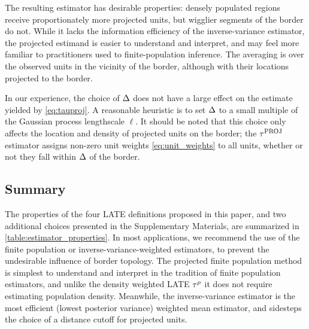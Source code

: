 The resulting estimator has desirable properties: densely populated regions receive proportionately more projected units, but wigglier segments of the border do not.
While it lacks the information efficiency of the inverse-variance estimator,
the projected estimand is easier to understand and interpret,
and may feel more familiar to practitioners used to finite-population inference.
The averaging is over the observed units in the vicinity of the border, although with their locations projected to the border.

In our experience, the choice of \(\Delta\) does not have a large effect on the estimate yielded by \autoref{eq:tauproj}.
A reasonable heuristic is to set \(\Delta\) to a small multiple of the Gaussian process lengthscale \(\ell\).
It should be noted that this choice only affects the location and density of projected units on the border; the \(\tau^{\mathrm{PROJ}}\) estimator assigns non-zero unit weights \autoref{eq:unit_weights} to all units, whether or not they fall within \(\Delta\) of the border.

\subsection{Summary}
\label{sec:summary}

The properties of the four LATE definitions proposed in this paper, and two additional choices presented in the Supplementary Materials, are summarized in \autoref{table:estimator_properties}.
In most applications, we recommend the use of the finite population or inverse-variance-weighted estimators, to prevent the undesirable influence of border topology.
The projected finite population method is simplest to understand and interpret in the tradition of finite population estimators, and unlike the density weighted LATE \(\tau^{\rho}\) it does not require estimating population density.
Meanwhile, the inverse-variance estimator is the most efficient (lowest posterior variance) weighted mean estimator,
and sidesteps the choice of a distance cutoff for projected units.

